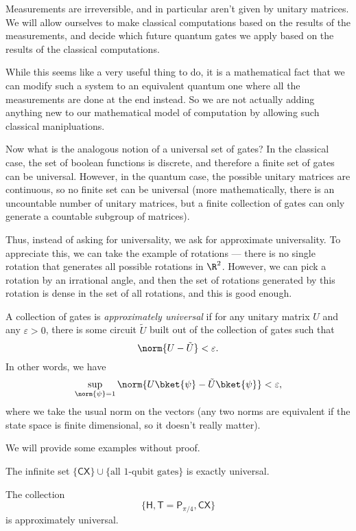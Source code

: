 \documentclass[a4paper]{article}
\newcommand{\qCX}{\mathsf{CX}}
\newcommand{\qH}{\mathsf{H}}
\newcommand{\qP}{\mathsf{P}}
\newcommand{\qT}{\mathsf{T}}
\begin{document}
Measurements are irreversible, and in particular aren't given by unitary matrices. We will allow ourselves to make classical computations based on the results of the measurements, and decide which future quantum gates we apply based on the results of the classical computations.

While this seems like a very useful thing to do, it is a mathematical fact that we can modify such a system to an equivalent quantum one where all the measurements are done at the end instead. So we are not actually adding anything new to our mathematical model of computation by allowing such classical manipluations.

Now what is the analogous notion of a universal set of gates? In the classical case, the set of boolean functions is discrete, and therefore a finite set of gates can be universal. However, in the quantum case, the possible unitary matrices are continuous, so no finite set can be universal (more mathematically, there is an uncountable number of unitary matrices, but a finite collection of gates can only generate a countable subgroup of matrices).

Thus, instead of asking for universality, we ask for approximate universality. To appreciate this, we can take the example of rotations --- there is no single rotation that generates all possible rotations in $\R^2$. However, we can pick a rotation by an irrational angle, and then the set of rotations generated by this rotation is dense in the set of all rotations, and this is good enough.

\begin{defi}
  A collection of gates is \emph{approximately universal} if for any unitary matrix $U$ and any $\varepsilon > 0$, there is some circuit $\tilde{U}$ built out of the collection of gates such that
  \[
    \norm{U - \tilde{U}} < \varepsilon.
  \]
  In other words, we have
  \[
    \sup_{\norm{\psi} = 1} \norm{U\bket{\psi} - \tilde{U} \bket{\psi}} < \varepsilon,
  \]
  where we take the usual norm on the vectors (any two norms are equivalent if the state space is finite dimensional, so it doesn't really matter).
\end{defi}

We will provide some examples without proof.
\begin{eg}
  The infinite set $\{\qCX\} \cup \{\text{all $1$-qubit gates}\}$ is exactly universal.
\end{eg}

\begin{eg}
  The collection
  \[
    \{\qH, \qT = \qP_{\pi/4}, \qCX\}
  \]
  is approximately universal.
\end{eg}
\end{document}

